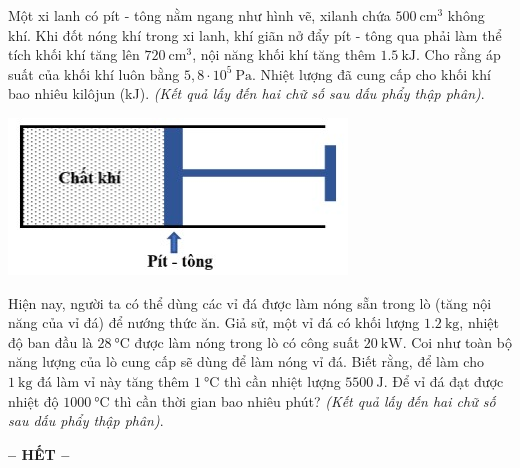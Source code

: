 \begin{ex}
	Một xi lanh có pít - tông nằm ngang như hình vẽ, xilanh chứa $\SI{500}{\centi\meter^3}$ không khí. Khi đốt nóng khí trong xi lanh, khí giãn nở đẩy pít - tông qua phải làm thể tích khối khí tăng lên $\SI{720}{\centi\meter^3}$, nội năng khối khí tăng thêm $\SI{1.5}{\kilo\joule}$. Cho rằng áp suất của khối khí luôn bằng $5,8 \cdot 10^{5} \mathrm{~Pa}$. Nhiệt lượng đã cung cấp cho khối khí bao nhiêu kilôjun (kJ). \textit{(Kết quả lấy đến hai chữ số sau dấu phẩy thập phân)}.
	\begin{center}
		\includegraphics[width=0.3\linewidth]{../figs/D12-1-6}
	\end{center}
\end{ex}
\begin{ex}
	Hiện nay, người ta có thể dùng các vỉ đá được làm nóng sẵn trong lò (tăng nội năng của vỉ đá) để nướng thức ăn. Giả sử, một vỉ đá có khối lượng $\SI{1.2}{\kilogram}$, nhiệt độ ban đầu là $\SI{28}{\celsius}$ được làm nóng trong lò có công suất $\SI{20}{\kilo\watt}$. Coi như toàn bộ năng lượng của lò cung cấp sẽ dùng để làm nóng vỉ đá. Biết rằng, để làm cho $\SI{1}{\kilogram}$ đá làm vỉ này tăng thêm $\SI{1}{\celsius}$ thì cần nhiệt lượng $\SI{5500}{\joule}$. Để vỉ đá đạt được nhiệt độ $\SI{1000}{\celsius}$ thì cần thời gian bao nhiêu phút? \textit{(Kết quả lấy đến hai chữ số sau dấu phẩy thập phân)}.
\end{ex}
\begin{center}
	\textbf{-- HẾT --}
\end{center}